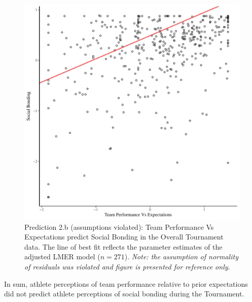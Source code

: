 \begin{CJK}{UTF8}{gbsn}


   \begin{figure}[htbp]
     \centering
   \includegraphics[scale=.5]{images/teamPerfBondOverallModelSlope.pdf}
     \caption{Prediction 2.b (assumptions violated): Team Performance Vs Expectations predict Social Bonding in the Overall Tournament data. The line of best fit reflects the parameter estimates of the adjusted LMER model ($n = 271$). \textit{Note: the assumption of normality of residuals was violated and figure is presented for reference only}.}
     \label{fig:teamPerfBondOverallModelSlope}
   \end{figure}


In sum, athlete perceptions of team performance relative to prior expectations did not predict athlete perceptions of social bonding during the Tournament.

















\end{CJK}
